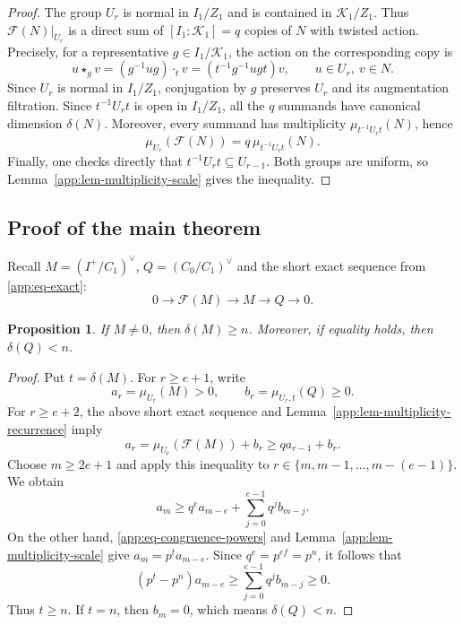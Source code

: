 \documentclass[11pt]{article}
\numberwithin{equation}{section}
\newtheorem{proposition}[theorem]{Proposition}
\theoremstyle{definition}
\theoremstyle{remark}
\begin{document}
\begin{cbunit}
\begin{proof}
The group $U_r$ is normal in $I_1/Z_1$ and is contained in
$\mathcal K_1/Z_1$. Thus $\mathcal F(N)|_{U_r}$ is a direct
sum of $[I_1:\mathcal K_1]=q$ copies of $N$ with twisted action.
Precisely, for a representative $g\in I_1/\mathcal K_1$, the
action on the corresponding copy is
\[
 u\star_g v=(g^{-1}ug)\cdot_t v=(t^{-1}g^{-1}ugt)v,
 \qquad u\in U_r,\ v\in N.
\]
Since $U_r$ is normal in $I_1/Z_1$, conjugation by $g$ preserves
$U_r$ and its augmentation filtration. Since $t^{-1}U_rt$ is
open in $I_1/Z_1$, all the $q$ summands have canonical dimension
$\delta(N)$. Moreover, every summand has multiplicity
$\mu_{t^{-1}U_rt}(N)$, hence
\[
 \mu_{U_r}(\mathcal F(N))=q\,\mu_{t^{-1}U_rt}(N).
\]
Finally, one checks directly that $t^{-1}U_rt\subseteq U_{r-1}$. Both groups are uniform,
so Lemma~\ref{app:lem-multiplicity-scale} gives the inequality.
\end{proof}

\subsection{Proof of the main theorem}

Recall $M=(I^+/C_1)^\vee$, $Q=(C_0/C_1)^\vee$ and the short
exact sequence from \eqref{app:eq-exact}:
\[
 0\longrightarrow\mathcal F(M)\longrightarrow M
   \longrightarrow Q\longrightarrow0.
\]

\begin{proposition}\label{app:prop-dimension-bound}
If $M\ne0$, then $\delta(M)\geq n$. Moreover, if equality holds,
then $\delta(Q)<n$.
\end{proposition}

\begin{proof}
Put $t=\delta(M)$. For $r\geq e+1$, write
\[
 a_r=\mu_{U_r}(M)>0,\qquad b_r=\mu_{U_r,t}(Q)\geq0.
\]
For $r\geq e+2$, the above short exact sequence and
Lemma~\ref{app:lem-multiplicity-recurrence} imply
\begin{equation}\label{app:eq-multiplicity-recurrence}
 a_r=\mu_{U_r}(\mathcal F(M))+b_r\geq qa_{r-1}+b_r.
\end{equation}
Choose $m\geq 2e+1$ and apply this inequality to
$r\in\{m,m-1,\ldots,m-(e-1)\}$. We obtain
\[
 a_m\geq q^e a_{m-e}+\sum_{j=0}^{e-1}q^j b_{m-j}.
\]
On the other hand, \eqref{app:eq-congruence-powers} and
Lemma~\ref{app:lem-multiplicity-scale} give $a_m=p^t a_{m-e}$.
Since $q^e=p^{ef}=p^n$, it follows that
\begin{equation}\label{app:eq-key-inequality}
 (p^t-p^n)a_{m-e}\geq\sum_{j=0}^{e-1}q^j b_{m-j}\geq0.
\end{equation}
Thus $t\geq n$. If $t=n$, then $b_m=0$, which means
$\delta(Q)<n$.
\end{proof}


\end{cbunit}
\end{document}
